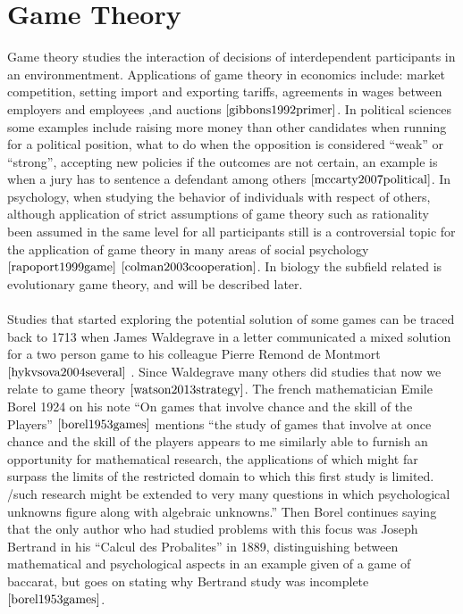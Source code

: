 \section{Game Theory}
\label{Literature:gt}
Game theory studies the interaction of decisions of interdependent participants in an environmentment. Applications of game theory in economics include: market competition, setting import and exporting tariffs, agreements in wages between employers and employees ,and auctions $\cite{gibbons1992primer}$. In political sciences some examples include raising more money than other candidates when running for a political position, what to do when the opposition is considered “weak” or “strong”, accepting new policies if the outcomes are not certain,  an example is when a jury has to sentence a defendant among others $\cite{mccarty2007political}$. In psychology, when studying the behavior of individuals with respect of others, although application of strict assumptions of game theory such as rationality been assumed in the same level for all participants still is a controversial topic for the application of game theory in many areas of social psychology $\cite{rapoport1999game}$ $\cite{colman2003cooperation}$. In biology the subfield related is evolutionary game theory, and will be described later. 
\\\\Studies that started exploring the potential solution of some games can be traced back to 1713  when James Waldegrave in a letter communicated a mixed solution for a two person game to his colleague Pierre Remond de Montmort $\cite{hykvsova2004several}$ . Since Waldegrave many others did studies that now we relate to game theory $\cite{watson2013strategy}$. The french mathematician Emile Borel 1924  on his note ``On games that involve chance and the skill of the Players'' $\cite{borel1953games}$ mentions  ``the study of games that involve at once chance and the skill of the players appears to me similarly able to furnish an opportunity for mathematical research, the applications of which might far surpass the limits of the restricted domain to which this first study is limited. /such research might be extended to very many questions in which psychological unknowns figure along with algebraic unknowns.'' Then Borel continues saying that the only author who had studied problems with this focus was Joseph Bertrand in his ``Calcul des Probalites'' in 1889, distinguishing between mathematical and psychological aspects in an example given of a game of baccarat, but goes on stating why Bertrand study was incomplete $\cite{borel1953games}$.
